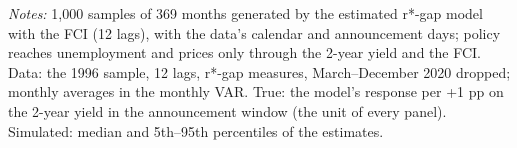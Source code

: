 \begin{table}[tp]\centering\small
\caption{A Monthly Proxy VAR when the r*-gap Model is the True Process}\label{tab:proxysim}
\begin{flushleft}\footnotesize\textit{Notes:} 1,000 samples of 369 months generated by the estimated r*-gap model with the FCI (12 lags), with the data's calendar and announcement days; policy reaches unemployment and prices only through the 2-year yield and the FCI. Data: the 1996 sample, 12 lags, r*-gap measures, March--December 2020 dropped; monthly averages in the monthly VAR. True: the model's response per +1 pp on the 2-year yield in the announcement window (the unit of every panel). Simulated: median and 5th--95th percentiles of the estimates.\end{flushleft}
\end{table}
